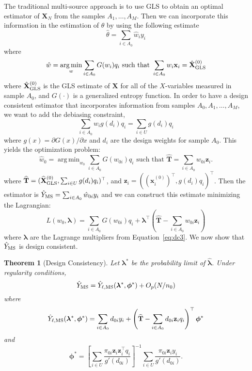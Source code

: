 \documentclass[12pt]{article}
\newtheorem{theorem}{Theorem}
\DeclareMathOperator*{\argmin}{arg\,min}
\renewcommand{\bf}[1]{\mathbf{#1}}
\begin{document}
The traditional multi-source approach \citep{kim2024statistics} is to use
GLS to obtain an optimal estimator of $\bf X_N$ from the
samples $A_1, \dots, A_M$. Then we can incorporate this information in the
estimation of $\theta$ by using the following estimate 
$$\hat \theta = \sum_{i \in A_0} \hat w_i y_i$$
where 
\begin{equation}\label{eq:mstps}
\hat w = \argmin_w \sum_{i \in A_0} G(w_i)q_i \text{ such that } 
\sum_{i \in A_0} w_i \bf x_i = \hat{\bf X}_{\rm{GLS}}^{(0)}
\end{equation}
where $\hat{\bf X}_{\rm{GLS}}^{(0)}$ is the GLS estimate of $\bf X$ for all of
the $X$-variables measured in sample $A_0$, and $G(\cdot)$ is a generalized entropy
function. 
In order to have a design consistent estimator that incorporates information from
samples $A_0, A_1, \dots, A_M$, we want to add the debiasing constraint, 
\begin{equation}\label{eq:msdebconstr}
\sum_{i \in A_0} w_{i} g(d_i) q_i = \sum_{i \in U} g(d_i) q_i
\end{equation}
where $g(x) = \partial G(x) / \partial x$ and $d_i$ are the design weights for
sample $A_0$. This yields the optimization problem:
\begin{equation}\label{eq:dc3}
  \hat w_0 = \argmin_{w_0} \sum_{i \in A_0} G(w_{0i}) q_i \text{ such that }
  \widehat{\bf{T}} = \sum_{i \in A_0} w_{0i} \bf z_i.
\end{equation}
where $\widehat{\bf{T}} = (\widehat{\bf X}_{\rm{GLS}}^{(0)},
\sum_{i \in U} g(d_i) q_i)^\top$,
and $\bf z_i = ((\bf x_i^{(0)})^\top, g(d_i)q_i)^\top$. Then
the estimator is $\hat Y_{\rm MS} = \sum_{i \in A_0} \hat w_{0i} y_i$ and we can
construct this estimate minimizing the Lagrangian:
$$
L(w_{0}, \bm \lambda) = \sum_{i \in A_0} G(w_{0i}) q_i + {\bm \lambda}^\top
\left(\widehat{\bf{T}} - \sum_{i \in A_0} w_{0i} \bf z_i\right)
$$
where $\bm \lambda$ are the Lagrange multipliers from Equation~\ref{eq:dc3}.
We now show that $\hat Y_{\rm MS}$ is design consistent.

\begin{theorem}[Design Consistency]
  Let $\bm \lambda^*$ be the probability limit of $\hat{\bm \lambda}$.
  Under regularity conditions,
  $$
  \hat Y_{\rm MS} = \hat Y_{\ell, \rm MS}(\bm \lambda^*, \bm \phi^*) + O_p(N / n_0)
  $$
  where
  $$
  \hat Y_{\ell, \rm MS}(\bm \lambda^*, \bm \phi^*) = 
  \sum_{i \in A_0} d_{0i} y_i + \left(
    \widehat{\bf T} - \sum_{i \in A_0} d_{0i} \bf z_i q_i
  \right)^\top \bm \phi^*
  $$
  and 
  $$
  \bm \phi^* = 
  \left[\sum_{i \in U} \frac{\pi_{0i} \bf z_i \bf z_i^\top q_i}{g'(d_{0i})}\right]^{-1}
  \sum_{i \in U} \frac{\pi_{0i} \bf z_i y_i}{g'(d_{0i})}.
  $$
\end{theorem}
\end{document}
